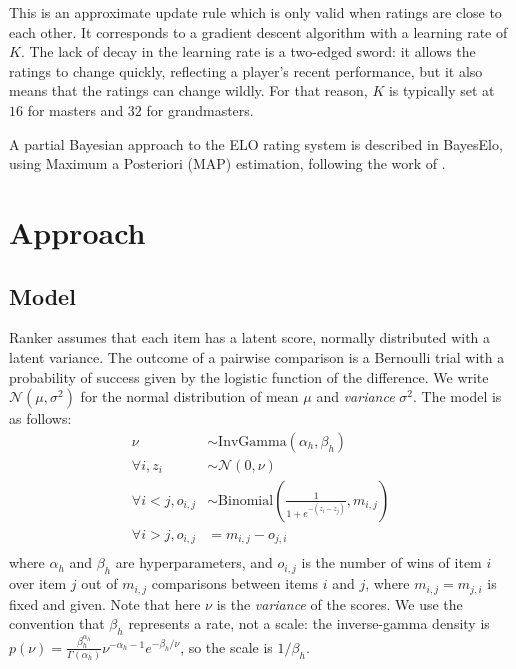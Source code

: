 \documentclass[12pt]{article}
\begin{document}
    This is an approximate update rule which is only valid when ratings are close to each other.
    It corresponds to a gradient descent algorithm with a learning rate of $K$. The lack of decay
    in the learning rate is a two-edged sword: it allows the ratings to change quickly, reflecting
    a player's recent performance, but it also means that the ratings can change wildly. For that
    reason, $K$ is typically set at $16$ for masters and $32$ for grandmasters.

    A partial Bayesian approach to the ELO rating system is described in BayesElo, using
    Maximum a Posteriori (MAP) estimation, following the work of \cite{10.1214/aos/1079120141}.

\section{Approach}

\subsection{Model}
    Ranker assumes that each item has a latent score, normally distributed with a latent
    variance. The outcome of a pairwise comparison is a Bernoulli trial with a probability
    of success given by the logistic function of the difference. We write $\mathcal{N}(\mu,
    \sigma^2)$ for the normal distribution of mean $\mu$ and \emph{variance} $\sigma^2$. The
    model is as follows:
    \begin{equation}
        \begin{aligned}
            \nu &\sim \text{InvGamma}(\alpha_h, \beta_h) \\
            \forall i, z_i &\sim \mathcal{N}(0, \nu) \\
            \forall i < j, o_{i,j} &\sim \text{Binomial}\left(\frac{1}{1 + e^{-(z_i - z_j)}}, m_{i,j}\right) \\
            \forall i > j, o_{i,j} &= m_{i,j} - o_{j,i} \\
        \end{aligned}
    \end{equation}
    where $\alpha_h$ and $\beta_h$ are hyperparameters, and $o_{i,j}$ is the number of wins of item $i$ over item $j$
    out of $m_{i,j}$ comparisons between items $i$ and $j$, where $m_{i,j} = m_{j, i}$ is fixed and given.
    Note that here $\nu$ is the \emph{variance} of the scores. We use the convention that $\beta_h$ represents
    a rate, not a scale: the inverse-gamma density is
    $p(\nu) = \frac{\beta_h^{\alpha_h}}{\Gamma(\alpha_h)} \nu^{-\alpha_h-1} e^{-\beta_h/\nu}$, so the scale is $1 / \beta_h$.
\end{document}
